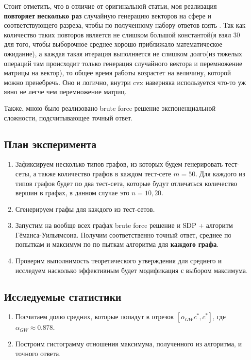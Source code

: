 \documentclass[12pt, a4paper]{article}
\begin{document}
Стоит отметить, что в отличие от оригинальной статьи, моя реализация \textbf{повторяет} \textbf{несколько раз} случайную генерацию векторов на сфере и соответствующего разреза, чтобы по полученному набору ответов взять . Так как количество таких повторов является не слишком большой константой(я взял $30$ для того, чтобы выборочное среднее хорошо приближало математическое ожидание), а каждая такая итерация выполняется не слишком долго(из тяжелых операций там происходит только генерация случайного вектора и перемножение матрицы на вектор), то общее время работы возрастет на величину, которой можно пренебречь. Оно и логично, внутри cvx наверняка используется что-то уж явно не легче чем перемножение матриц.

Также, мною было реализовано brute force решение экспоненциальной сложности, подсчитывающее точный ответ.\\

\subsection{План эксперимента}

\begin{enumerate}
    \item Зафиксируем несколько типов графов, из которых будем генерировать тест-сеты, а также количество графов в каждом тест-сете $m=50$. Для каждого из типов графов будет по два тест-сета, которые будут отличаться количество вершин в графах, в данном случае это $n=10,20$.
    \item Сгенерируем графы для каждого из тест-сетов.
    \item Запустим на вообще всех графах brute force решение и SDP + алгоритм Гёманса-Уильямсона. Получим соответственно точный ответ, среднее по попыткам и максимум по по пыткам алгоритма для \textbf{каждого графа}.
    \item Проверим выполнимость теоретического утверждения для среднего и исследуем насколько эффективным будет модификация с выбором максимума.
\end{enumerate}

\subsection{Исследуемые статистики}

\begin{enumerate}
    \item Посчитаем долю средних, которые попадут в отрезок $[\alpha_{GW} c^*, c^*]$, где $\alpha_{GW} \approx 0.878$.
    \item Построим гистограмму отношения максимума, полученного из алгоритма, и точного ответа.
\end{enumerate}
\end{document}
